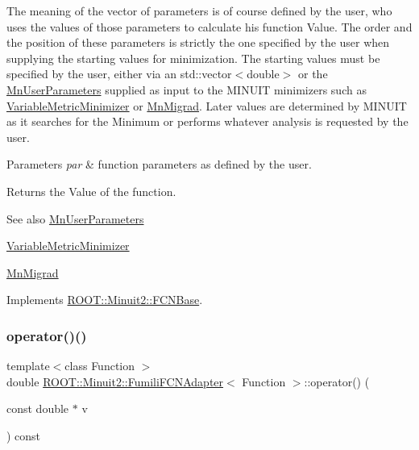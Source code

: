 The meaning of the vector of parameters is of course defined by the user, who uses the values of those parameters to calculate his function Value. The order and the position of these parameters is strictly the one specified by the user when supplying the starting values for minimization. The starting values must be specified by the user, either via an std\+::vector$<$double$>$ or the \mbox{\hyperlink{classROOT_1_1Minuit2_1_1MnUserParameters}{Mn\+User\+Parameters}} supplied as input to the M\+I\+N\+U\+IT minimizers such as \mbox{\hyperlink{classROOT_1_1Minuit2_1_1VariableMetricMinimizer}{Variable\+Metric\+Minimizer}} or \mbox{\hyperlink{classROOT_1_1Minuit2_1_1MnMigrad}{Mn\+Migrad}}. Later values are determined by M\+I\+N\+U\+IT as it searches for the Minimum or performs whatever analysis is requested by the user.


\begin{DoxyParams}{Parameters}
{\em par} & function parameters as defined by the user.\\
\hline
\end{DoxyParams}
\begin{DoxyReturn}{Returns}
the Value of the function.
\end{DoxyReturn}
\begin{DoxySeeAlso}{See also}
\mbox{\hyperlink{classROOT_1_1Minuit2_1_1MnUserParameters}{Mn\+User\+Parameters}} 

\mbox{\hyperlink{classROOT_1_1Minuit2_1_1VariableMetricMinimizer}{Variable\+Metric\+Minimizer}} 

\mbox{\hyperlink{classROOT_1_1Minuit2_1_1MnMigrad}{Mn\+Migrad}} 
\end{DoxySeeAlso}


Implements \mbox{\hyperlink{classROOT_1_1Minuit2_1_1FCNBase_ae4a86bd94d0d0f5ca6fc8f8ab2bb43cd}{R\+O\+O\+T\+::\+Minuit2\+::\+F\+C\+N\+Base}}.

\mbox{\label{classROOT_1_1Minuit2_1_1FumiliFCNAdapter_a0e1a10d68960c681ab3e4d5af5c1018b}} 
\subsubsection{\texorpdfstring{operator()()}{operator()()}\hspace{0.1cm}{\footnotesize\ttfamily [4/6]}}
{\footnotesize\ttfamily template$<$class Function $>$ \\
double \mbox{\hyperlink{classROOT_1_1Minuit2_1_1FumiliFCNAdapter}{R\+O\+O\+T\+::\+Minuit2\+::\+Fumili\+F\+C\+N\+Adapter}}$<$ Function $>$\+::operator() (\begin{DoxyParamCaption}\item[{const double $\ast$}]{v }\end{DoxyParamCaption}) const\hspace{0.3cm}{\ttfamily [inline]}}


